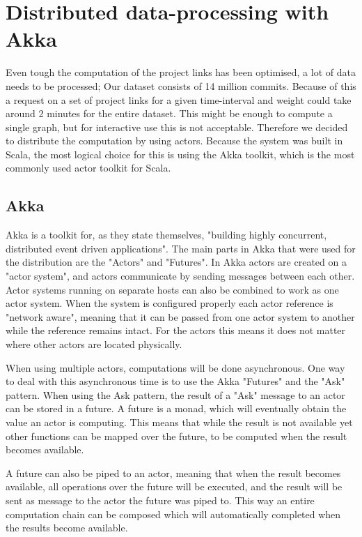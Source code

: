 \documentclass[10pt,a4paper]{article}
\begin{document}
\section{Distributed data-processing with Akka}\label{sec:distributed}
Even tough the computation of the project links has been optimised,  a lot of data needs to be processed; Our dataset consists of 14 million commits. Because of this a request on a set of project links for a given time-interval and weight could take around 2 minutes for the entire dataset. This might be enough to compute a single graph, but for interactive use this is not acceptable. Therefore we decided to distribute the computation by using actors. Because the system was built in Scala, the most logical choice for this is using the Akka toolkit, which is the most commonly used actor toolkit for Scala.

\subsection{Akka}

Akka is a toolkit for, as they state themselves, "building highly concurrent, distributed event driven applications". The main parts in Akka that were used for the distribution are the "Actors" and "Futures". In Akka actors are created on a "actor system", and actors communicate by sending messages between each other. Actor systems running on separate hosts can also be combined to work as one actor system. When the system is configured properly each actor reference is "network aware", meaning that it can be passed from one actor system to another while the reference remains intact. For the actors this means it does not matter where other actors are located physically.

When using multiple actors, computations will be done asynchronous. One way to deal with this asynchronous time is to use the Akka "Futures" and the "Ask" pattern. When using the Ask pattern, the result of a "Ask" message to an actor can be stored in a future. A future is a monad, which will eventually obtain the value an actor is computing. This means that while the result is not available yet other functions can be mapped over the future, to be computed when the result becomes available. 

A future can also be piped to an actor, meaning that when the result becomes available, all operations over the future will be executed, and the result will be sent as message to the actor the future was piped to. This way an entire computation chain can be composed which will automatically completed when the results become available.
\end{document}
